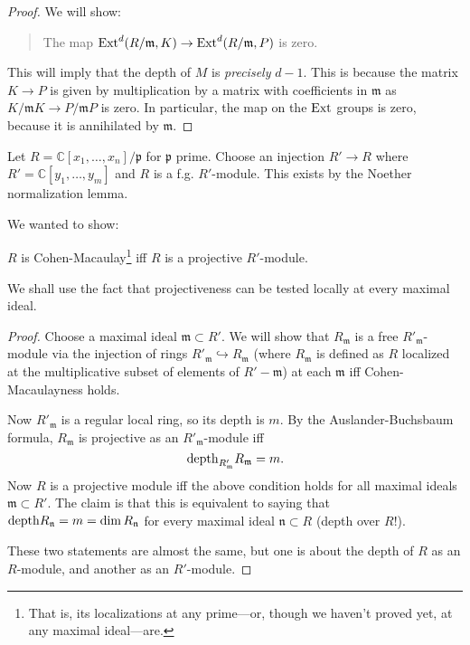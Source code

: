 \begin{proof}
We will show:
\begin{quote}
The map $\mathrm{Ext}^d(R/\mathfrak{m}, K) \to \mathrm{Ext}^{d}(R/\mathfrak{m},
P)$ is zero.
\end{quote}
This will imply that the depth of $M$ is \emph{precisely} $d-1$.
This is because the matrix $K \to P$ is given by multiplication
by a matrix
with coefficients in $\mathfrak{m}$ as $K/\mathfrak{m}K \to
P/\mathfrak{m}P$
is zero. In particular, the map on the $\mathrm{Ext}$ groups is zero,
because it is
annihilated by $\mathfrak{m}$.
\end{proof} 

\begin{example} 
Let $R = \mathbb{C}[x_1, \dots, x_n]/\mathfrak{p}$ for
$\mathfrak{p}$ prime.
Choose an injection $R' \to R$ where $R' = \mathbb{C}[y_1,
\dots, y_m]$ and
$R$ is a f.g. $R'$-module. This exists by the Noether
normalization lemma.

We wanted to show:

\begin{theorem} 
$R$ is Cohen-Macaulay\footnote{That is, its localizations at any
prime---or,
though we haven't proved yet, at any maximal ideal---are.} iff
$R$ is a
projective $R'$-module.
\end{theorem} 

We shall use the fact that projectiveness can be tested locally
at every
maximal ideal.

\begin{proof} 
Choose a maximal ideal $\mathfrak{m} \subset R'$. We will show
that
$R_{\mathfrak{m}}$ is a free $R'_{\mathfrak{m}}$-module via the
injection of
rings $R'_{\mathfrak{m}} \hookrightarrow R_{\mathfrak{m}}$
(where
$R_{\mathfrak{m}}$ is defined as $R$ localized at the
multiplicative subset
of elements of $R' - \mathfrak{m}$) at each $\mathfrak{m}$ iff
Cohen-Macaulayness holds.

Now $R'_{\mathfrak{m}}$ is a regular local ring, so its depth is
$m$. By the
Auslander-Buchsbaum formula, $R_{\mathfrak{m}}$ is projective as
an
$R'_{\mathfrak{m}}$-module iff 
\[ \mathrm{depth}_{R'_{\mathfrak{m}}} R_{\mathfrak{m}} = m.  \]
Now $R$ is a projective module iff the above condition holds for
all maximal
ideals $\mathfrak{m} \subset R'$. The claim is that this is
equivalent to
saying that $\mathrm{depth} R_{\mathfrak{n}} = m = \dim
R_{\mathfrak{n}}$
for every maximal ideal $\mathfrak{n} \subset R$ (depth over
$R$!).

These two statements are almost the same, but one is about the
depth of $R$ as
an $R$-module, and another as an $R'$-module. 


\end{proof}
\end{example}

